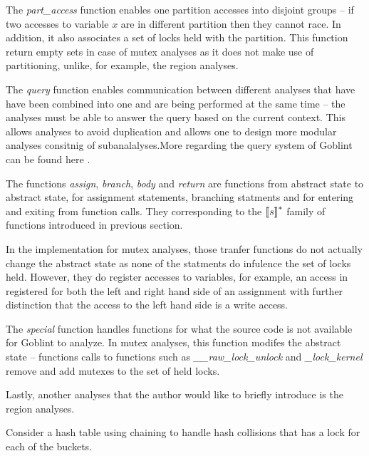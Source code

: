 \documentclass[..thesis.tex]{subfiles}
\begin{document}
The \textit{part\_access} function enables one partition accesses into disjoint groups -- if two accesses to variable $x$ are in different partition then they cannot race.
In addition, it also associates a set of locks held with the partition. This function return empty sets in case of mutex analyses as it does not make use of partitioning,
unlike, for example, the region analyses.

The \textit{query} function enables communication between different analyses that have have been combined into one and are being performed at the same time -- 
the analyses must be able to answer the query based on the current context. This allows analyses to avoid duplication and allows one to design more modular analyses consitnig of subanalalyses.More regarding the query system of Goblint can be found here .

The functions \textit{assign}, \textit{branch}, \textit{body} and \textit{return} are functions from abstract state to abstract state, for assignment statements,
branching statments and for entering and exiting from function calls. They corresponding to the $\left\llbracket s \right\rrbracket^{*}$ family of functions introduced in previous section.


In the implementation for mutex analyses, those tranfer functions do not actually change the abstract state as none of the statments do infulence the set of locks held.
However, they do register accesses to variables, for example, an access in registered for both the left and right hand side of an assignment with further distinction
that the access to the left hand side is a write access.

The \textit{special} function handles functions for what the source code is not available for Goblint to analyze. In mutex analyses,
 this function modifes the abstract state -- functions calls to functions such as \textit{\_\_raw\_lock\_unlock} and \textit{\_lock\_kernel} 
remove and add mutexes to the set of held locks.



Lastly, another analyses that the author would like to briefly introduce is the region analyses.


Consider a hash table using chaining to handle hash collisions that has a lock for each of the buckets.
\end{document}
